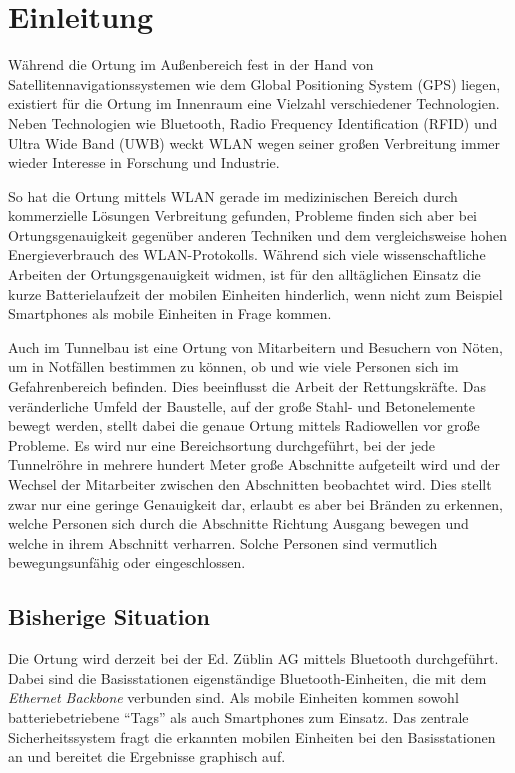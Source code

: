 \chapter{Einleitung}
\label{ch:Einleitung}
Während die Ortung im Außenbereich fest in der Hand von Satellitennavigationssystemen wie dem Global Positioning System (GPS) liegen, existiert für die Ortung im Innenraum eine Vielzahl verschiedener Technologien. Neben Technologien wie Bluetooth, Radio Frequency Identification (RFID) und Ultra Wide Band (UWB) weckt WLAN wegen seiner großen Verbreitung immer wieder Interesse in Forschung und Industrie. 

So hat die Ortung mittels WLAN gerade im medizinischen Bereich durch kommerzielle Lösungen Verbreitung gefunden, Probleme finden sich aber bei Ortungsgenauigkeit gegenüber anderen Techniken und dem vergleichsweise hohen Energieverbrauch des WLAN-Protokolls.
Während sich viele wissenschaftliche Arbeiten der Ortungsgenauigkeit widmen, ist für den alltäglichen Einsatz die kurze Batterielaufzeit der mobilen Einheiten hinderlich, wenn nicht zum Beispiel Smartphones als mobile Einheiten in Frage kommen. 

Auch im Tunnelbau ist eine Ortung von Mitarbeitern und Besuchern von Nöten, um in Notfällen bestimmen zu können, ob und wie viele Personen sich im Gefahrenbereich befinden. 
Dies beeinflusst die Arbeit der Rettungskräfte. 
Das veränderliche Umfeld der Baustelle, auf der große Stahl- und Betonelemente bewegt werden, stellt dabei die genaue Ortung mittels Radiowellen vor große Probleme.
Es wird nur eine Bereichsortung durchgeführt, bei der jede Tunnelröhre in mehrere hundert Meter große Abschnitte aufgeteilt wird und der Wechsel der Mitarbeiter zwischen den Abschnitten beobachtet wird. 
Dies stellt zwar nur eine geringe Genauigkeit dar, erlaubt es aber bei Bränden zu erkennen, welche Personen sich durch die Abschnitte Richtung Ausgang bewegen und welche in ihrem Abschnitt verharren. 
Solche Personen sind vermutlich bewegungsunfähig oder eingeschlossen.


\section{Bisherige Situation}
Die Ortung wird derzeit bei der Ed. Züblin AG mittels Bluetooth durchgeführt. 
Dabei sind die Basisstationen eigenständige Bluetooth-Einheiten, die mit dem \emph{Ethernet Backbone} verbunden sind.
Als mobile Einheiten kommen sowohl batteriebetriebene "`Tags"' als auch Smartphones zum Einsatz. 
Das zentrale Sicherheitssystem fragt die erkannten mobilen Einheiten bei den Basisstationen an und bereitet die Ergebnisse graphisch auf.

